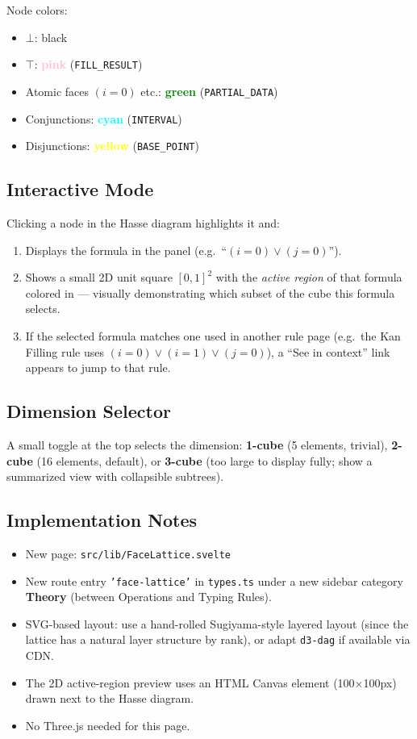 \documentclass[11pt,a4paper]{article}
\begin{document}
\noindent Node colors:
\begin{itemize}
  \item $\bot$: black
  \item $\top$: \textcolor{pink}{\textbf{pink}} (\texttt{FILL\_RESULT})
  \item Atomic faces $(i=0)$ etc.: \textcolor{green}{\textbf{green}} (\texttt{PARTIAL\_DATA})
  \item Conjunctions: \textcolor{cyan}{\textbf{cyan}} (\texttt{INTERVAL})
  \item Disjunctions: \textcolor{yellow}{\textbf{yellow}} (\texttt{BASE\_POINT})
\end{itemize}

\subsection{Interactive Mode}

Clicking a node in the Hasse diagram highlights it and:
\begin{enumerate}
  \item Displays the formula in the panel (e.g.\ ``$(i=0) \vee (j=0)$'').
  \item Shows a small 2D unit square $[0,1]^2$ with the \emph{active region}
    of that formula colored in — visually demonstrating which subset of the
    cube this formula selects.
  \item If the selected formula matches one used in another rule page (e.g.\ the
    Kan Filling rule uses $(i=0)\vee(i=1)\vee(j=0)$), a ``See in context'' link
    appears to jump to that rule.
\end{enumerate}

\subsection{Dimension Selector}

A small toggle at the top selects the dimension: \textbf{1-cube}
(5 elements, trivial), \textbf{2-cube} (16 elements, default), or
\textbf{3-cube} (too large to display fully; show a summarized view with
collapsible subtrees).

\subsection{Implementation Notes}

\begin{itemize}
  \item New page: \texttt{src/lib/FaceLattice.svelte}
  \item New route entry \texttt{'face-lattice'} in \texttt{types.ts} under
    a new sidebar category \textbf{Theory} (between Operations and Typing Rules).
  \item SVG-based layout: use a hand-rolled Sugiyama-style layered layout
    (since the lattice has a natural layer structure by rank), or adapt
    \texttt{d3-dag} if available via CDN.
  \item The 2D active-region preview uses an HTML Canvas element (100×100px)
    drawn next to the Hasse diagram.
  \item No Three.js needed for this page.
\end{itemize}
\end{document}
